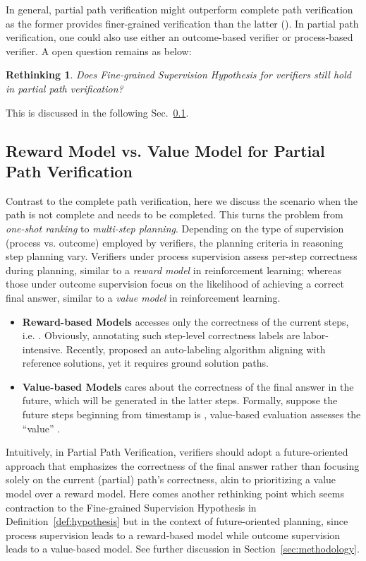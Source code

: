 \documentclass[11pt]{article}
\theoremstyle{plain}
\theoremstyle{claim}
\theoremstyle{rethinking}
\newtheorem{rethinking}{Rethinking}
\theoremstyle{researchquestion}
\theoremstyle{findings}
\theoremstyle{fact}
\theoremstyle{proper}
\theoremstyle{remark}
\begin{document}
In general, partial path verification might outperform  complete path verification as the former provides finer-grained verification than the latter (\citealp{khalifa2023guided}).
In  partial path verification, one could also use either  an outcome-based verifier or process-based verifier. A open question remains as below:
\begin{rethinking}
    \textit{Does Fine-grained Supervision Hypothesis for verifiers still hold in  partial path verification?}
\end{rethinking}

This is discussed in the following Sec.~\ref{sec:reward_value}.

\subsection{Reward Model vs. Value Model for Partial Path Verification}
\label{sec:reward_value}

Contrast to the complete path verification,  here we discuss the scenario when the path is not complete and needs to be completed. This turns the problem from \textit{ one-shot ranking}  to  \textit{multi-step planning}. 
Depending on the type of supervision (process vs. outcome) employed by verifiers, the planning criteria in reasoning step planning vary. Verifiers under process supervision assess per-step correctness during planning, similar to a \textit{reward model} in reinforcement learning; whereas those under outcome supervision focus on the likelihood of achieving a correct final answer, similar to a \textit{value model} in reinforcement learning.


\begin{itemize}
    \item \textbf{Reward-based Models}   accesses only  the correctness of the current steps, i.e. . Obviously, annotating such step-level correctness labels are labor-intensive. Recently, \citet{grace23} proposed an auto-labeling algorithm aligning with reference solutions, yet it requires ground solution paths.
    \item \textbf{Value-based Models}  cares about the correctness of the final answer in the future, which will be generated in the latter steps. Formally, suppose the future steps beginning from timestamp  is , value-based evaluation assesses the ``value'' . 
\end{itemize}




Intuitively,  in Partial Path Verification, verifiers should adopt a future-oriented approach that emphasizes the correctness of the final answer rather than focusing solely on the current (partial) path's correctness, akin to prioritizing a value model over a reward model. Here comes another rethinking point which seems contraction to the Fine-grained Supervision Hypothesis in Definition~\ref{def:hypothesis} but in the context of future-oriented planning, since process supervision leads to a reward-based model while outcome supervision leads to a value-based model. See further discussion in Section~\ref{sec:methodology}.
\end{document}
